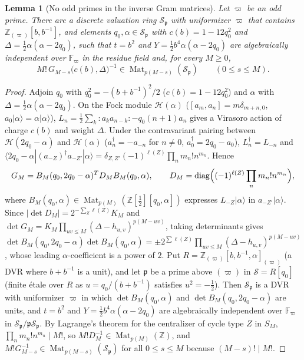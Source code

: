 \documentclass[twoside,10pt]{article}
\numberwithin{equation}{section}
\theoremstyle{slbody}
\newtheorem{lemma}[theorem]{Lemma}
\theoremstyle{definition}
\theoremstyle{remark}
\begin{document}
\begin{lemma}[No odd primes in the inverse Gram matrices]\label{lem:odd-primes}
Let \(\varpi\) be an odd prime.  There are a discrete valuation ring
\({\mathcal S}_{\mathfrak p}\) with uniformizer \(\varpi\) that contains
\(\mathbb Z_{(\varpi)}[b,b^{-1}]\), and elements \(q_0,\alpha\in{\mathcal S}_{\mathfrak p}\) with
\(c(b)=1-12q_0^2\) and \(\Delta=\frac12\alpha(\alpha-2q_0)\), such that
\(t=b^2\) and \(Y=\frac12b^4\alpha(\alpha-2q_0)\) are algebraically independent
over \(\mathbb F_\varpi\) in the residue field and, for every \(M\geq0\),
\[
 M!\,G_{M-s}\bigl(c(b),\Delta\bigr)^{-1}\in\operatorname{Mat}_{p(M-s)}({\mathcal S}_{\mathfrak p})
 \qquad(0\leq s\leq M).
\]
\end{lemma}

\begin{proof}
Adjoin \(q_0\) with
\(q_0^2=-(b+b^{-1})^2/2\) (\(c(b)=1-12q_0^2\)) and \(\alpha\) with
\(\Delta=\frac12\alpha(\alpha-2q_0)\).  On the Fock module
\({\mathcal H}(\alpha)\) (\([a_m,a_n]=m\delta_{m+n,0}\),
\(a_0|\alpha\rangle=\alpha|\alpha\rangle\)),
\(L_n=\frac12\sum_k{:}a_ka_{n-k}{:}-q_0(n+1)a_n\) gives a Virasoro action of
charge \(c(b)\) and weight \(\Delta\).  Under the contravariant pairing between
\({\mathcal H}(2q_0-\alpha)\) and \({\mathcal H}(\alpha)\)
(\(a_n^\dagger=-a_{-n}\) for \(n\neq0\), \(a_0^\dagger=2q_0-a_0\)),
\(L_n^\dagger=L_{-n}\) and
\(\langle2q_0-\alpha|(a_{-Z})^\dagger a_{-Z'}|\alpha\rangle
=\delta_{Z,Z'}(-1)^{\ell(Z)}\prod_n m_n!n^{m_n}\).  Hence
\[
 G_M=B_M(q_0,2q_0-\alpha)^TD_MB_M(q_0,\alpha),\qquad
 D_M=\operatorname{diag}\Bigl((-1)^{\ell(Z)}\prod_n m_n!n^{m_n}\Bigr),
\]
where
\(B_M(q_0,\alpha)\in\operatorname{Mat}_{p(M)}(\mathbb Z[\tfrac12][q_0,\alpha])\)
expresses \(L_{-Z}|\alpha\rangle\) in \(a_{-Z'}|\alpha\rangle\).  Since
\(|\det D_M|=2^{-\sum_Z\ell(Z)}K_M\) and
\(\det G_M=K_M\prod_{uv\leq M}(\Delta-h_{u,v})^{p(M-uv)}\), taking determinants gives
\(\det B_M(q_0,2q_0-\alpha)\det B_M(q_0,\alpha)
=\pm2^{\sum\ell(Z)}\prod_{uv\leq M}(\Delta-h_{u,v})^{p(M-uv)}\), whose
leading \(\alpha\)-coefficient is a power of \(2\).  Put
\(R=\mathbb Z_{(\varpi)}[b,b^{-1},\alpha]_{(\varpi)}\) (a DVR where
\(b+b^{-1}\) is a unit), and let \(\mathfrak p\) be a prime above \((\varpi)\) in
\({\mathcal S}=R[q_0]\) (finite \'etale over \(R\) as \(u=q_0/(b+b^{-1})\)
satisfies \(u^2=-\tfrac12\)).  Then \({\mathcal S}_{\mathfrak p}\) is a DVR
with uniformizer \(\varpi\) in which \(\det B_M(q_0,\alpha)\) and
\(\det B_M(q_0,2q_0-\alpha)\) are units, and \(t=b^2\) and
\(Y=\frac12b^4\alpha(\alpha-2q_0)\) are algebraically independent over
\(\mathbb F_\varpi\) in \({\mathcal S}_{\mathfrak p}/\mathfrak p{\mathcal S}_{\mathfrak p}\).
By Lagrange's theorem for the
centralizer of cycle type \(Z\) in \(S_M\),
\(\prod_n m_n!n^{m_n}\mid M!\), so
\(M!D_M^{-1}\in\operatorname{Mat}_{p(M)}(\mathbb Z)\), and
\(M!G_{M-s}^{-1}\in\operatorname{Mat}_{p(M-s)}({\mathcal S}_{\mathfrak p})\)
for all \(0\leq s\leq M\) because \((M-s)!\mid M!\).
\end{proof}
\end{document}
